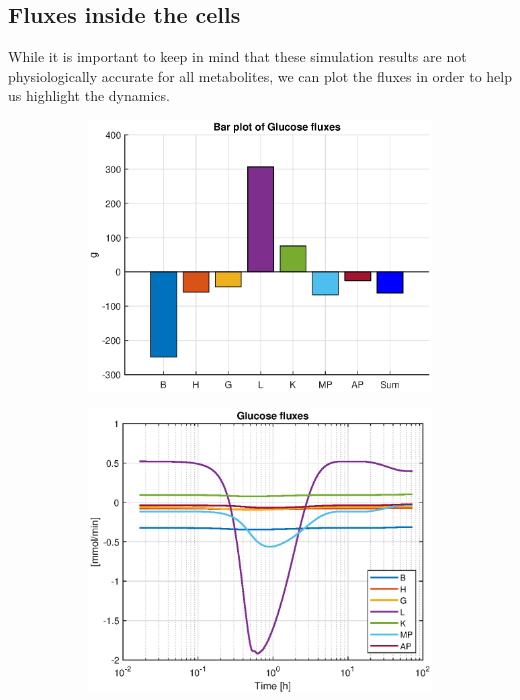 \documentclass{IEEEtran}
\begin{document}
\subsection{Fluxes inside the cells}

While it is important to keep in mind that these simulation results are not physiologically accurate for all metabolites, we can plot the fluxes in order to help us highlight the dynamics.



\begin{figure}[H]
     \centering
     \begin{subfigure}{1\columnwidth}
         \centering
         \caption{}
         \includegraphics[trim=0 0 0 0, clip,width=\columnwidth, height=0.25\textheight, keepaspectratio]{Diagrams/Fasting/Flux/bar_plot_flux.eps}
         \label{fig:barplot_glucose}
     \end{subfigure}
     \hfill
     \begin{subfigure}{1\columnwidth}
         \centering
         \caption{}
         \includegraphics[trim=0 0 0 0, clip,width=\columnwidth, height=0.25\textheight, keepaspectratio]{Diagrams/Fasting/Flux/glucose_flux.eps}

\end{subfigure}
\end{figure}
\end{document}
